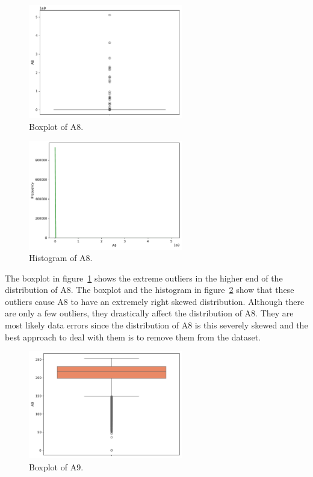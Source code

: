 \documentclass[11pt]{report}
\begin{document}
\begin{figure}[H]
    \centering
    \includegraphics[width=0.6\textwidth]{images/A8_boxplot.pdf}
    \caption{Boxplot of A8.}
    \label{fig:a8_boxplot}
\end{figure}

\begin{figure}[H]
    \centering
    \includegraphics[width=0.6\textwidth]{images/A8_histplot.pdf}
    \caption{Histogram of A8.}
    \label{fig:a8_histplot}
\end{figure}

The boxplot in figure~\ref{fig:a8_boxplot} shows the extreme outliers in the higher end of the distribution of A8. The boxplot and the histogram in figure~\ref{fig:a8_histplot} show that these outliers cause A8 to have an extremely right skewed distribution. Although there are only a few outliers, they drastically affect the distribution of A8. They are most likely data errors since the distribution of A8 is this severely skewed and the best approach to deal with them is to remove them from the dataset.

\begin{figure}[H]
    \centering
    \includegraphics[width=0.6\textwidth]{images/A9_boxplot.pdf}
    \caption{Boxplot of A9.}
    \label{fig:a9_boxplot}
\end{figure}
\end{document}
